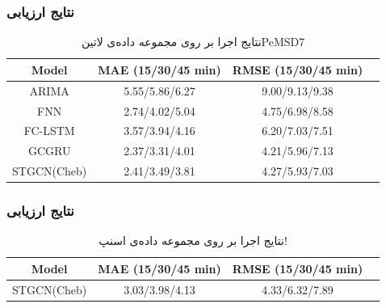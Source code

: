 \documentclass{beamer}
\begin{document}
\begin{frame}
  \frametitle{نتایج ارزیابی}
  \begin{table}[h]
    \centering
    \caption{نتایج اجرا بر روی مجموعه داده‌ی ‌لاتین{PeMSD7}}
    \begin{latin}\begin{tabular}{|c|c|c|c|}
      \hline
      Model & MAE (15/30/45 min) & RMSE (15/30/45 min) \\
      \hline
      ARIMA & 5.55/5.86/6.27 & 9.00/9.13/9.38 \\
      \hline
      FNN & 2.74/4.02/5.04 & 4.75/6.98/8.58 \\
      \hline
      FC-LSTM & 3.57/3.94/4.16 & 6.20/7.03/7.51 \\
      \hline
      GCGRU & 2.37/3.31/4.01 & 4.21/5.96/7.13 \\
      \hline
      STGCN(Cheb) & 2.41/3.49/3.81 & 4.27/5.93/7.03 \\
      \hline
    \end{tabular}\end{latin}
  \end{table}
\end{frame}

\begin{frame}
  \frametitle{نتایج ارزیابی}
  \begin{table}[h]
    \centering
    \caption{نتایج اجرا بر روی مجموعه داده‌ی اسنپ!}
    \begin{latin}\begin{tabular}{|c|c|c|c|}
      \hline
      Model & MAE (15/30/45 min) & RMSE (15/30/45 min) \\
      \hline
      STGCN(Cheb) & 3.03/3.98/4.13 & 4.33/6.32/7.89 \\
      \hline
    \end{tabular}\end{latin}
  \end{table}
\end{frame}
\end{document}
